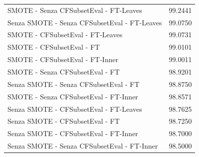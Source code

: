 \begin{table}[htbp]
	\begin{tabular}{ll}
		SMOTE - Senza CFSubsetEval - FT-Leaves	& 99.2441 \\
		Senza SMOTE - Senza CFSubsetEval - FT-Leaves & 99.0750 \\
		SMOTE - CFSubsetEval - FT-Leaves & 99.0731 \\
		SMOTE - CFSubsetEval - FT & 99.0101 \\
		SMOTE - CFSubsetEval - FT-Inner	& 99.0011 \\		
		SMOTE - Senza CFSubsetEval - FT & 98.9201 \\
		Senza SMOTE - Senza CFSubsetEval - FT & 98.8750 \\
		SMOTE - Senza CFSubsetEval - FT-Inner & 98.8571 \\
		Senza SMOTE - CFSubsetEval - FT-Leaves & 98.7625 \\
		Senza SMOTE - CFSubsetEval - FT & 98.7250 \\
		Senza SMOTE - CFSubsetEval - FT-Inner & 98.7000 \\
		Senza SMOTE - Senza CFSubsetEval - FT-Inner & 98.5000 \\
	\end{tabular}
\end{table}













